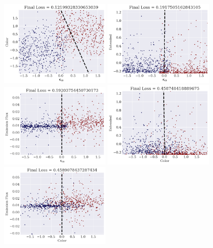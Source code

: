 \begin{figure}
    \centering
    \includegraphics[width=0.48\textwidth]{results/2d_fit_line_minim_kappa_color.png}
    \includegraphics[width=0.48\textwidth]{results/2d_fit_line_minim_kappa_extended.png}
    \includegraphics[width=0.48\textwidth]{results/2d_fit_line_minim_kappa_emission_flux.png}
    \includegraphics[width=0.48\textwidth]{results/2d_fit_line_minim_color_extended.png}
    \includegraphics[width=0.48\textwidth]{results/2d_fit_line_minim_color_emission_flux.png}

\end{figure}
